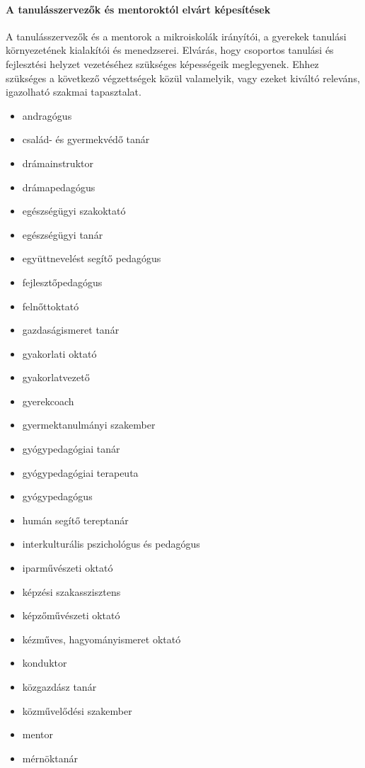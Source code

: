 \paragraph{A tanulásszervezők és mentoroktól elvárt képesítések} A
tanulásszervezők és a mentorok a mikroiskolák irányítói, a gyerekek tanulási
környezetének kialakítói és menedzserei. Elvárás, hogy csoportos tanulási és
fejlesztési helyzet vezetéséhez szükséges képességeik meglegyenek. Ehhez
szükséges a következő végzettségek közül valamelyik, vagy ezeket kiváltó
releváns, igazolható szakmai tapasztalat.
\begin{itemize}
    \item andragógus
    \item család- és gyermekvédő tanár
    \item drámainstruktor
    \item drámapedagógus
    \item egészségügyi szakoktató
    \item egészségügyi tanár
    \item együttnevelést segítő pedagógus
    \item fejlesztőpedagógus
    \item felnőttoktató
    \item gazdaságismeret tanár
    \item gyakorlati oktató
    \item gyakorlatvezető
    \item gyerekcoach
    \item gyermektanulmányi szakember
    \item gyógypedagógiai tanár
    \item gyógypedagógiai terapeuta
    \item gyógypedagógus
    \item humán segítő tereptanár
    \item interkulturális pszichológus és pedagógus
    \item iparművészeti oktató
    \item képzési szakasszisztens
    \item képzőművészeti oktató
    \item kézműves, hagyományismeret oktató
    \item konduktor
    \item közgazdász tanár
    \item közművelődési szakember
    \item mentor
    \item mérnöktanár

\end{itemize}
